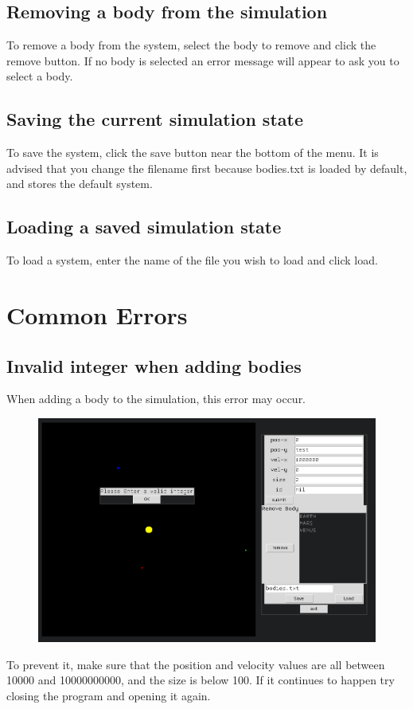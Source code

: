 \documentclass[a4paper,11pt,titlepage]{article}
\begin{document}
\subsection{Removing a body from the simulation}
To remove a body from the system, select the body to remove and click the remove
button. If no body is selected an error message will appear to ask you to select
a body.

\subsection{Saving the current simulation state}
To save the system, click the save button near the bottom of the menu. It is
advised that you change the filename first because bodies.txt is loaded by
default, and stores the default system.

\subsection{Loading a saved simulation state}
To load a system, enter the name of the file you wish to load and click load.

\section{Common Errors}
\subsection{Invalid integer when adding bodies}
When adding a body to the simulation, this error may occur.
\begin{figure}[H]
	\includegraphics[width=\textwidth]{../img/add2.png}
\end{figure}
To prevent it, make sure that the position and velocity values are all between
10000 and 10000000000, and the size is below 100. If it continues to happen try
closing the program and opening it again.
\end{document}
